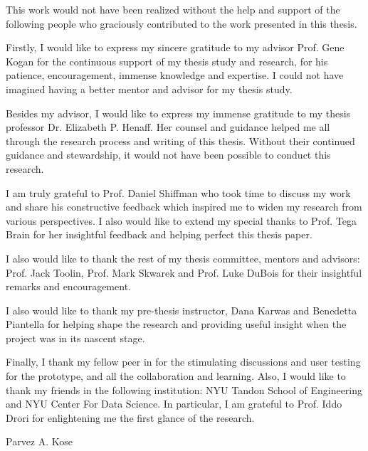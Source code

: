 %
%
%
%
%

\begin{acknowledgments} 

This work would not have been realized without the help and support of the following people who graciously contributed to the work presented in this thesis.

Firstly, I would like to express my sincere gratitude to my advisor Prof. Gene Kogan for the continuous support of my thesis study and research, for his patience, encouragement, immense knowledge and expertise. I could not have imagined having a better mentor and advisor for my thesis study.

Besides my advisor, I would like to express my immense gratitude to my thesis professor Dr. Elizabeth P. Henaff. Her counsel and guidance helped me all through the research process and writing of this thesis. Without their continued guidance and stewardship, it would not have been possible to conduct this research.

I am truly grateful to Prof. Daniel Shiffman who took time to discuss my work and share his constructive feedback which inspired me to widen my research from various perspectives. I also would like to extend my special thanks to Prof. Tega Brain for her insightful feedback and helping perfect this thesis paper.

I also would like to thank the rest of my thesis committee, mentors and advisors: Prof. Jack Toolin, Prof. Mark Skwarek and Prof. Luke DuBois for their insightful remarks and encouragement.

I also would like to thank my pre-thesis instructor, Dana Karwas and Benedetta Piantella for helping shape the research and providing useful insight when the project was in its nascent stage.

Finally, I thank my fellow peer in for the stimulating discussions and user testing for the prototype, and all the collaboration and learning. Also, I would like to thank my friends in the following institution: NYU Tandon School of Engineering and NYU Center For Data Science. In particular, I am grateful to Prof. Iddo Drori for enlightening me the first glance of the research.


\begin{flushright} 
Parvez A. Kose
\end{flushright}
\end{acknowledgments}

